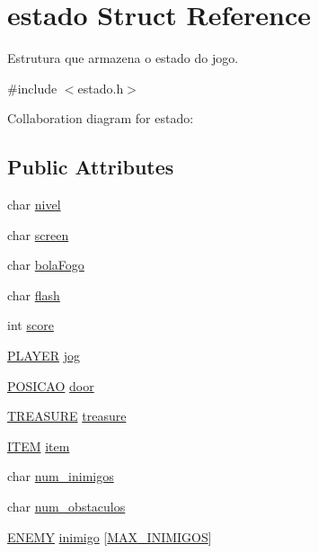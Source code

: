 \hypertarget{structestado}{}\section{estado Struct Reference}
\label{structestado}


Estrutura que armazena o estado do jogo.  




{\ttfamily \#include $<$estado.\+h$>$}



Collaboration diagram for estado\+:
\subsection*{Public Attributes}
\begin{DoxyCompactItemize}
\item 
char \hyperlink{structestado_a620f2f81ebfe4cba1d6e44b09a1762f7}{nivel}
\item 
char \hyperlink{structestado_a9e83d6dd64bf8e642bd6089ed0429c9c}{screen}
\item 
char \hyperlink{structestado_ab2fb851219c49552677f99c5759797ed}{bola\+Fogo}
\item 
char \hyperlink{structestado_aabc94c34319b0500ee6eb353f35c9caa}{flash}
\item 
int \hyperlink{structestado_a47e99ef4241dfe72d9d68244a68adb46}{score}
\item 
\hyperlink{estado_8h_a1c5dfb515f896e023ef1ab976a7d9e55}{P\+L\+A\+Y\+ER} \hyperlink{structestado_aba384d85c8fd0406b06aa2f478874bc1}{jog}
\item 
\hyperlink{estado_8h_a55b3f4b56938eeb8fa5e8f9c07baf1b0}{P\+O\+S\+I\+C\+AO} \hyperlink{structestado_a7415ebf0dc1fbc535407bb2bd669dc81}{door}
\item 
\hyperlink{estado_8h_a915d62cffb534f2a6557ce29c9c50624}{T\+R\+E\+A\+S\+U\+RE} \hyperlink{structestado_ae4cc2103608d31c5a97732cc6411334a}{treasure}
\item 
\hyperlink{estado_8h_abb89e4e096567d9205a898bda0a14bfe}{I\+T\+EM} \hyperlink{structestado_a2c147e6348aeaa62b05ff2109f0f2bf4}{item}
\item 
char \hyperlink{structestado_a6fbc4a80c4f371036f264ecfe27e5f9e}{num\+\_\+inimigos}
\item 
char \hyperlink{structestado_ac1a8a541e2301189833c6f713c416063}{num\+\_\+obstaculos}
\item 
\hyperlink{estado_8h_a9f02ab0e6d0d32d23cd5f9f81e8c69f9}{E\+N\+E\+MY} \hyperlink{structestado_a85c620d8bd760efde2d2681df831dcb2}{inimigo} \mbox{[}\hyperlink{estado_8h_aa97e6cbfdd94711688f1176cb8dd916a}{M\+A\+X\+\_\+\+I\+N\+I\+M\+I\+G\+OS}\mbox{]}

\end{DoxyCompactItemize}

